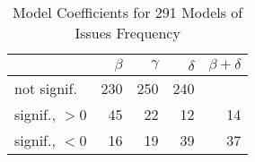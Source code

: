 
\begin{table}[t] \centering
\small
  \caption{Model Coefficients for 291 Models of Issues Frequency}
  \label{Table:rddmodels_issues}
\begin{tabular}{ l  r r r r }        
\hline 

 & $\beta$ & $\gamma$ & $\delta$ & $\beta + \delta$ \\ 
 \hline 
 \hline
not signif. & 230 & 250 & 240 & \\
\hline
signif., $>0$ & 45 & 22 & 12 & 14 \\
\hline
signif., $<0$ & 16 & 19 & 39 & 37 \\
\hline
\end{tabular}
\end{table}